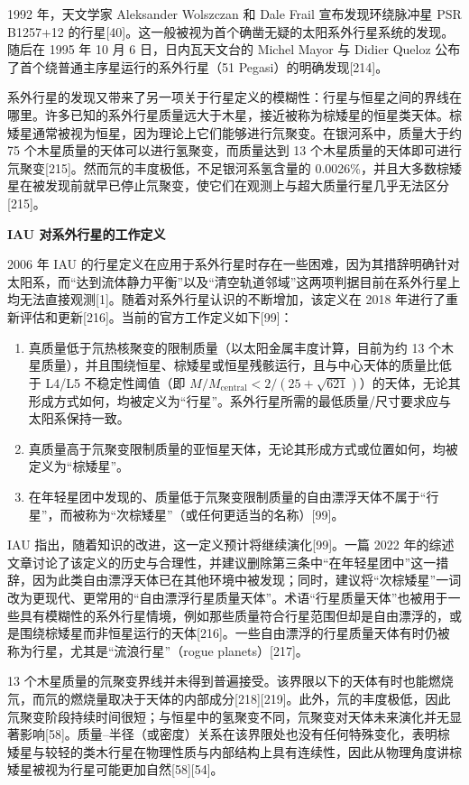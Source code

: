 1992 年，天文学家 Aleksander Wolszczan 和 Dale Frail 宣布发现环绕脉冲星 PSR B1257+12 的行星[40]。这一般被视为首个确凿无疑的太阳系外行星系统的发现。随后在 1995 年 10 月 6 日，日内瓦天文台的 Michel Mayor 与 Didier Queloz 公布了首个绕普通主序星运行的系外行星（51 Pegasi）的明确发现[214]。

系外行星的发现又带来了另一项关于行星定义的模糊性：行星与恒星之间的界线在哪里。许多已知的系外行星质量远大于木星，接近被称为棕矮星的恒星类天体。棕矮星通常被视为恒星，因为理论上它们能够进行氘聚变。在银河系中，质量大于约 75 个木星质量的天体可以进行氢聚变，而质量达到 13 个木星质量的天体即可进行氘聚变[215]。然而氘的丰度极低，不足银河系氢含量的 0.0026\%，并且大多数棕矮星在被发现前就早已停止氘聚变，使它们在观测上与超大质量行星几乎无法区分[215]。

\textbf{IAU 对系外行星的工作定义}

2006 年 IAU 的行星定义在应用于系外行星时存在一些困难，因为其措辞明确针对太阳系，而“达到流体静力平衡”以及“清空轨道邻域”这两项判据目前在系外行星上均无法直接观测[1]。随着对系外行星认识的不断增加，该定义在 2018 年进行了重新评估和更新[216]。当前的官方工作定义如下[99]：

\begin{enumerate}
\item 真质量低于氘热核聚变的限制质量（以太阳金属丰度计算，目前为约 13 个木星质量），并且围绕恒星、棕矮星或恒星残骸运行，且与中心天体的质量比低于 L4/L5 不稳定性阈值（即 $M/M_{\text{central}} < 2/(25+\sqrt{621})$）的天体，无论其形成方式如何，均被定义为“行星”。系外行星所需的最低质量/尺寸要求应与太阳系保持一致。
\item 真质量高于氘聚变限制质量的亚恒星天体，无论其形成方式或位置如何，均被定义为“棕矮星”。
\item 在年轻星团中发现的、质量低于氘聚变限制质量的自由漂浮天体不属于“行星”，而被称为“次棕矮星”（或任何更适当的名称）[99]。
\end{enumerate}
IAU 指出，随着知识的改进，这一定义预计将继续演化[99]。一篇 2022 年的综述文章讨论了该定义的历史与合理性，并建议删除第三条中“在年轻星团中”这一措辞，因为此类自由漂浮天体已在其他环境中被发现；同时，建议将“次棕矮星”一词改为更现代、更常用的“自由漂浮行星质量天体”。术语“行星质量天体”也被用于一些具有模糊性的系外行星情境，例如那些质量符合行星范围但却是自由漂浮的，或是围绕棕矮星而非恒星运行的天体[216]。一些自由漂浮的行星质量天体有时仍被称为行星，尤其是“流浪行星”（rogue planets）[217]。

13 个木星质量的氘聚变界线并未得到普遍接受。该界限以下的天体有时也能燃烧氘，而氘的燃烧量取决于天体的内部成分[218][219]。此外，氘的丰度极低，因此氘聚变阶段持续时间很短；与恒星中的氢聚变不同，氘聚变对天体未来演化并无显著影响[58]。质量–半径（或密度）关系在该界限处也没有任何特殊变化，表明棕矮星与较轻的类木行星在物理性质与内部结构上具有连续性，因此从物理角度讲棕矮星被视为行星可能更加自然[58][54]。

